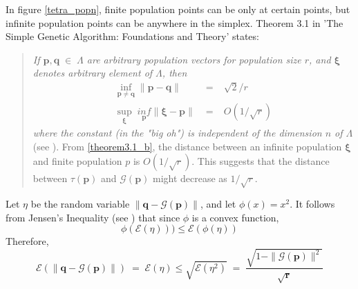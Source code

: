 In figure \ref{tetra_popn}, finite population points can be only at certain points, but infinite population points can be anywhere in the simplex. 
Theorem 3.1 in 'The Simple Genetic Algorithm: Foundations and Theory' states:  
\begin{quote}
\emph{If $\bm{p},\bm{q} \;\in\; \Lambda$ are 
arbitrary population vectors for population size $r$, and $\bm{\xi}$ denotes arbitrary element of $\Lambda$, then 
\begin{eqnarray}
\underset{\bm{p} \neq \bm{q}}{\inf} \|\bm{p} - \bm{q}\| &\;=\;& \sqrt{2}/r    \label{theorem3.1_a} \\
\underset{\bm{\xi}}{\sup} \; \underset{\bm{p}}{inf} \|\bm{\xi} - \bm{p}\| &\;=\;& O(1/\sqrt{r})     \label{theorem3.1b}
\end{eqnarray}
where the constant (in the "big oh") is independent of the dimension $n$ of $\Lambda$} (see \cite{Vose1999}).
From \ref{theorem3.1_b}, the distance between an infinite population $\bm{\xi}$ and finite population $p$ is $O(1/\sqrt{r})$. 
This suggests that the distance between $\tau (\bm{p})$ and $\mathcal{G}(\bm{p})$ might decrease as $1/\sqrt{r}$.
\end{quote}

Let $\eta$ be the random variable $\| \bm{q} - \mathcal{G}(\bm{p}) \|$, and let $\phi (x) = x^2$. 
It follows from Jensen's Inequality (see \cite{JensenInequality}) that 
since $\phi$ is a convex function, 
\[
\phi(\mathcal{E}(\eta))) \leq \mathcal{E}(\phi(\eta)) 
\]
Therefore,
\begin{equation}
\label{Jensen}
\mathcal{E}(\| \bm{q} - \mathcal{G}(\bm{p}) \|) \;=\; \mathcal{E}(\eta) \leq \sqrt{\mathcal{E}(\eta^2)} \;=\; \frac{\sqrt{1 - \|\mathcal{G}(\bm{p})\|^2}}{\sqrt{\bm{r}}}
\end{equation}

